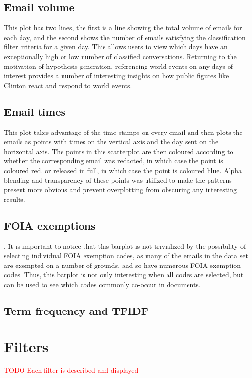 \documentclass[journal]{vgtc}                %
\newcommand*{\TODO}[1]{\textcolor{red}{TODO #1}}
\begin{document}
\subsection{Email volume}
This plot has two lines, the first is a line showing the total volume of emails for each day, and the second shows the number of emails satisfying the classification filter criteria for a given day. This allows users to view which days have an exceptionally high or low number of classified conversations. Returning to the motivation of hypothesis generation, referencing world events on any days of interest provides a number of interesting insights on how public figures like Clinton react and respond to world events.

\subsection{Email times}
This plot takes advantage of the time-stamps on every email and then plots the emails as points with times on the vertical axis and the day sent on the horizontal axis. The points in this scatterplot are then coloured according to whether the corresponding email was redacted, in which case the point is coloured red, or released in full, in which case the point is coloured blue. Alpha blending and transparency of these points was utilized to make the patterns present more obvious and prevent overplotting from obscuring any interesting results. 

\subsection{FOIA exemptions}.
 It is important to notice that this barplot is not trivialized by the possibility of selecting individual FOIA exemption codes, as many of the emails in the data set are exempted on a number of grounds, and so have numerous FOIA exemption codes. Thus, this barplot is not only interesting when all codes are selected, but can be used to see which codes commonly co-occur in documents.

\subsection{Term frequency and TFIDF}


\section{Filters}
\TODO{Each filter is described and displayed }
\end{document}
